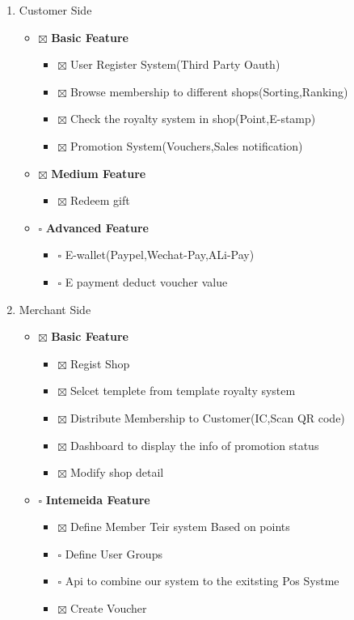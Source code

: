 \documentclass[12pt]{scrartcl}
\begin{document}
\begin{enumerate}
\item Customer Side
\label{sec:orga5e19e1}

\begin{itemize}
\item $\boxtimes$ \textbf{Basic Feature}
\begin{itemize}
\item $\boxtimes$ User Register System(Third Party Oauth)
\item $\boxtimes$ Browse membership to different shops(Sorting,Ranking)
\item $\boxtimes$ Check the royalty system in shop(Point,E-stamp)
\item $\boxtimes$ Promotion System(Vouchers,Sales notification)
\end{itemize}

\item $\boxtimes$ \textbf{Medium Feature}
\begin{itemize}
\item $\boxtimes$ Redeem gift
\end{itemize}

\item $\square$ \textbf{Advanced Feature}
\begin{itemize}
\item $\square$ E-wallet(Paypel,Wechat-Pay,ALi-Pay)
\item $\square$ E payment deduct voucher value
\end{itemize}
\end{itemize}

\item Merchant Side
\label{sec:orgaa21aa2}

\begin{itemize}
\item $\boxtimes$ \textbf{Basic Feature}
\begin{itemize}
\item $\boxtimes$ Regist Shop
\item $\boxtimes$ Selcet templete from template royalty system
\item $\boxtimes$ Distribute Membership to Customer(IC,Scan QR code)
\item $\boxtimes$ Dashboard to display the info of promotion status
\item $\boxtimes$ Modify shop detail
\end{itemize}

\item $\square$ \textbf{Intemeida Feature}
\begin{itemize}
\item $\boxtimes$ Define Member Teir system Based on points
\item $\square$ Define User Groups
\item $\square$ Api to combine our system to the exitsting Pos Systme
\item $\boxtimes$ Create Voucher
\end{itemize}


\end{itemize}
\end{enumerate}
\end{document}
